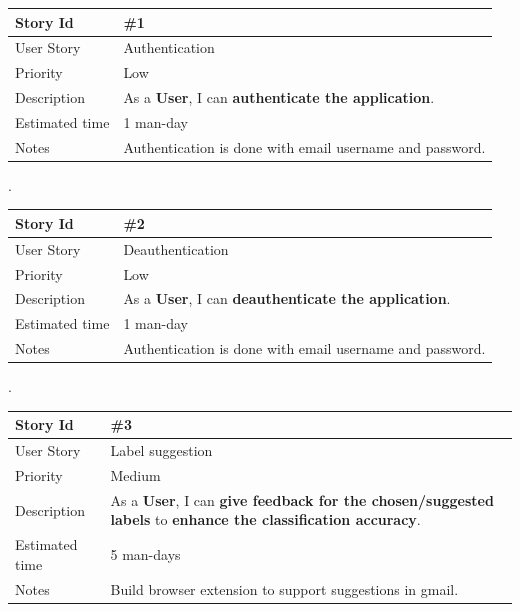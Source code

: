\documentclass[a4paper,10pt]{article}
\begin{document}

\begin{tabular}{|p{3cm}|p{10cm}|}
\hline
\cellcolor[gray]{0.9} Story Id & \#1 \\ \hline
\cellcolor[gray]{0.9} User Story & Authentication \\ \hline
\cellcolor[gray]{0.9} Priority & Low \\ \hline
\cellcolor[gray]{0.9} Description & 
      As a \textbf{User}, I can \textbf{authenticate the application}. \\ \hline
\cellcolor[gray]{0.9} Estimated time & 1 man-day \\ \hline
\cellcolor[gray]{0.9} Notes & 
      Authentication is done with email username and password. \\ \hline
\end{tabular}

.\\

\begin{tabular}{|p{3cm}|p{10cm}|}
\hline
\cellcolor[gray]{0.9} Story Id & \#2 \\ \hline
\cellcolor[gray]{0.9} User Story & Deauthentication \\ \hline
\cellcolor[gray]{0.9} Priority & Low \\ \hline
\cellcolor[gray]{0.9} Description & 
	As a \textbf{User}, I can \textbf{deauthenticate the application}. \\ \hline
\cellcolor[gray]{0.9} Estimated time & 1 man-day \\ \hline
\cellcolor[gray]{0.9} Notes & 
	Authentication is done with email username and password. \\ \hline
\end{tabular}


.\\

\begin{tabular}{|p{3cm}|p{10cm}|}
\hline
\cellcolor[gray]{0.9} Story Id & \#3 \\ \hline
\cellcolor[gray]{0.9} User Story & Label suggestion \\ \hline
\cellcolor[gray]{0.9} Priority & Medium\\ \hline
\cellcolor[gray]{0.9} Description & 
	As a \textbf{User}, I can \textbf{give feedback for the chosen/suggested labels} to
	\textbf{enhance the classification accuracy}. \\ \hline
\cellcolor[gray]{0.9} Estimated time & 5 man-days\\ \hline
\cellcolor[gray]{0.9} Notes & 
	Build browser extension to support suggestions in gmail. \\ \hline
\end{tabular}
\end{document}
